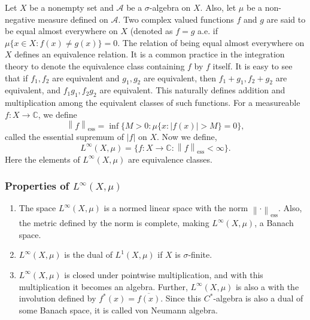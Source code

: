 \documentclass[12pt]{article}
\newcommand*{\norm}[1]{\left\lVert #1\right\rVert}
\begin{document}
Let $X$ be a nonempty set and $\mathcal{A}$ be a $\sigma$-algebra on $X$. Also, let $\mu$ be a non-negative measure defined on $\mathcal{A}$. 
Two complex valued functions $f$ and $g$ are said to be equal almost everywhere on $X$ 
(denoted as $f = g$ a.e. if $\mu \{x \in X : f(x) \ne g(x) \} = 0.$ The relation of being equal almost everywhere on $X$ defines an equivalence relation. 
It is a common practice in the integration theory to denote the equivalence class containing $f$ by $f$ itself. 
It is easy to see that if $f_1,f_2$ are equivalent and $g_1,g_2$ are equivalent, then $f_1 + g_1, f_2+g_2$ are equivalent, and $f_1  g_1, f_2g_2$ are equivalent. 
This naturally defines addition and multiplication among the equivalent classes of such functions.
For a measureable 
$f \colon X \to \mathbb{C}$, we define  
$$
  \norm{f}_{\text{ess}} = \operatorname{inf}\{M > 0 \colon \mu \{x : |f(x)| > M\} = 0\},
$$
called the essential supremum of $|f|$ on $X$. 
Now we define, 
$$
  L^{\infty}(X,\mu) = \{f : X \to \mathbb{C} : \norm{f}_{\text{ess}} < \infty\}.
$$ 
Here the elements of $L^{\infty}(X,\mu)$ are equivalence classes. 
\subsubsection*{Properties of $L^\infty(X,\mu)$}
\begin{enumerate}
\item The space $L^{\infty}(X,\mu)$ is a normed linear space with the 
   norm $\norm{\cdot}_{\text{ess}}$. Also, the metric defined by 
   the norm is complete, making $L^{\infty}(X,\mu)$, a Banach space. 
\item  $L^{\infty}(X,\mu)$ is the dual of $L^1(X,\mu)$ if $X$ is $\sigma$-finite. 
\item  $L^{\infty}(X,\mu)$ is closed under pointwise multiplication, and
with this multiplication it becomes an algebra. 
Further, $L^{\infty}(X,\mu)$ is also a  with the involution defined by $f^*(x) = \overline{f(x)}$. Since this $C^*$-algebra is also a dual of some Banach space, it is called von Neumann algebra.
\end{enumerate}
\end{document}
